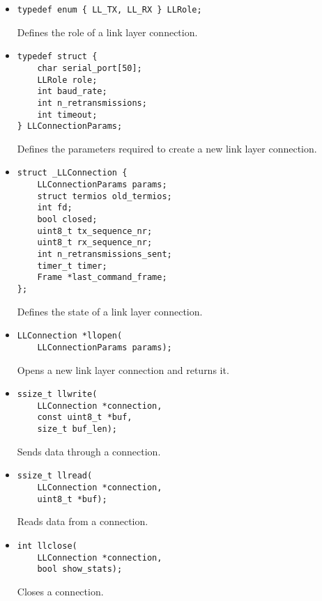 \documentclass[11pt,a4paper,twocolumn]{article}
\begin{document}
\begin{itemize}
    \item \begin{lstlisting}
typedef enum { LL_TX, LL_RX } LLRole;
    \end{lstlisting}

          Defines the role of a link layer connection.

    \item \begin{lstlisting}
typedef struct {
    char serial_port[50];
    LLRole role;
    int baud_rate;
    int n_retransmissions;
    int timeout;
} LLConnectionParams;
    \end{lstlisting}

          Defines the parameters required to create a new link layer connection.

    \item \begin{lstlisting}
struct _LLConnection {
    LLConnectionParams params;
    struct termios old_termios;
    int fd;
    bool closed;
    uint8_t tx_sequence_nr;
    uint8_t rx_sequence_nr;
    int n_retransmissions_sent;
    timer_t timer;
    Frame *last_command_frame;
};
    \end{lstlisting}

          Defines the state of a link layer connection.

    \item \begin{lstlisting}
LLConnection *llopen(
    LLConnectionParams params);
    \end{lstlisting}

          Opens a new link layer connection and returns it.

    \item \begin{lstlisting}
ssize_t llwrite(
    LLConnection *connection,
    const uint8_t *buf,
    size_t buf_len);
    \end{lstlisting}

          Sends data through a connection.

    \item \begin{lstlisting}
ssize_t llread(
    LLConnection *connection, 
    uint8_t *buf);
    \end{lstlisting}

          Reads data from a connection.

    \item \begin{lstlisting}
int llclose(
    LLConnection *connection, 
    bool show_stats);
    \end{lstlisting}

          Closes a connection.
\end{itemize}
\end{document}
